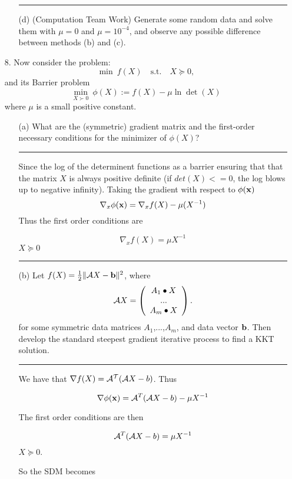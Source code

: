 \documentclass{article} %
\renewcommand\b{{\bf b}}
\newcommand\x{{\bf x}}
\begin{document}
\begin{enumerate}
\begin{itemize}
\rule{\textwidth}{1pt}


\item[(d)] (Computation Team Work) Generate some random data and solve them with $\mu=0$ and $\mu=10^{-4}$, and observe any possible difference between methods (b) and (c).
\end{itemize}

\item[8.] Now consider the problem:
\[\min\ f(X)\quad \mbox{s.t.}\quad X\succeq 0,\]
and its Barrier problem
\[\min_{X\succ 0}\ \phi(X):=f(X)-\mu\ln\det(X)\]
where $\mu$ is a small positive constant.

\begin{itemize}
\item[(a)] What are the (symmetric) gradient matrix and the first-order necessary conditions for the minimizer of $\phi(X)$?

\rule{\textwidth}{1pt}
Since the log of the determinent functions as a barrier ensuring that that the matrix $X$ is always positive definite (if $det(X) <= 0$, the log blows up to negative infinity). Taking the gradient with respect to $\phi(\x)$
\[
\nabla_x \phi(\x) = \nabla_x f(X) - \mu (X^{-1}) 
\]
Thus the first order conditions are 

\[
\nabla_x f(X) = \mu X^{-1}
\]
$X \succeq 0$


\rule{\textwidth}{1pt}

\item[(b)] Let $f(X)=\frac{1}{2}\|{\cal A}X-\b\|^2$, where
\[{\cal A}X=\left(\begin{array}{c}
                           A_1\bullet X\\
                           ...\\
                           A_m\bullet X
                           \end{array}\right).\]
for some symmetric data matrices $A_1$,...,$A_m$, and data vector $\b$.
Then develop the standard steepest gradient iterative process to find a KKT solution.


\rule{\textwidth}{1pt}


We have that $\nabla f(X) = {\cal A^T} ({\cal A} X - b)$. Thus 

\[
\nabla \phi(\x) =  {\cal A}^{T} ({\cal A} X - b) - \mu X^{-1}
\]

The first order conditions are then

\[
{\cal A}^T ({\cal A} X - b) = \mu X^{-1}
\]
$X \succeq 0$. 

So the SDM becomes


\end{itemize}
\end{enumerate}
\end{document}
